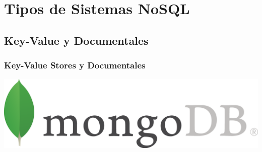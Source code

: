 \documentclass[14pt]{beamer}
\begin{document}

\section{Tipos de Sistemas NoSQL}


\subsection{Key-Value y Documentales}

\begin{frame}
  \frametitle{Key-Value Stores y Documentales}
  \includegraphics[width=\textwidth]{img/MongoDB}
\end{frame}
\end{document}
